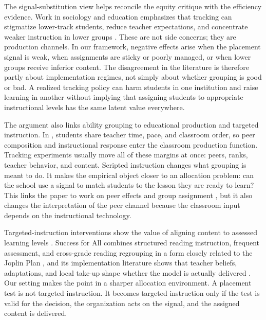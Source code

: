 \documentclass[11pt]{article}
\begin{document}
The signal-substitution view helps reconcile the equity critique with the efficiency evidence. Work in sociology and education emphasizes that tracking can stigmatize lower-track students, reduce teacher expectations, and concentrate weaker instruction in lower groups \citep{oakes1985,gamoran1992,gamorannystrand1994}. These are not side concerns; they are production channels. In our framework, negative effects arise when the placement signal is weak, when assignments are sticky or poorly managed, or when lower groups receive inferior content. The disagreement in the literature is therefore partly about implementation regimes, not simply about whether grouping is good or bad. A realized tracking policy can harm students in one institution and raise learning in another without implying that assigning students to appropriate instructional levels has the same latent value everywhere.

The argument also links ability grouping to educational production and targeted instruction. In \citet{Lazear2001}, students share teacher time, pace, and classroom order, so peer composition and instructional response enter the classroom production function. Tracking experiments usually move all of these margins at once: peers, ranks, teacher behavior, and content. Scripted instruction changes what grouping is meant to do. It makes the empirical object closer to an allocation problem: can the school use a signal to match students to the lesson they are ready to learn? This links the paper to work on peer effects and group assignment \citep{hoxby2005taking,carrellsacerdotewest2013,vigdor2007peer,rjosk2022dispersion}, but it also changes the interpretation of the peer channel because the classroom input depends on the instructional technology.

Targeted-instruction interventions show the value of aligning content to assessed learning levels \citep{banerjee2017proof,duflo2020experimental,muralidharan2019disrupting}. Success for All combines structured reading instruction, frequent assessment, and cross-grade reading regrouping in a form closely related to the Joplin Plan \citep{cheung2021success}, and its implementation literature shows that teacher beliefs, adaptations, and local take-up shape whether the model is actually delivered \citep{datnowcastellano2000}. Our setting makes the point in a sharper allocation environment. A placement test is not targeted instruction. It becomes targeted instruction only if the test is valid for the decision, the organization acts on the signal, and the assigned content is delivered.
\end{document}
